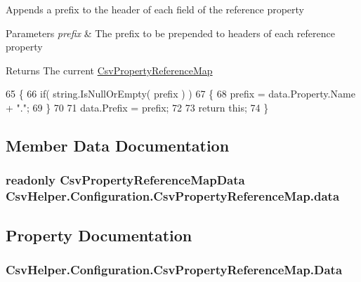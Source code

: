 Appends a prefix to the header of each field of the reference property 


\begin{DoxyParams}{Parameters}
{\em prefix} & The prefix to be prepended to headers of each reference property\\
\hline
\end{DoxyParams}
\begin{DoxyReturn}{Returns}
The current \hyperlink{a00055}{Csv\-Property\-Reference\-Map}
\end{DoxyReturn}

\begin{DoxyCode}
65         \{
66             \textcolor{keywordflow}{if}( \textcolor{keywordtype}{string}.IsNullOrEmpty( prefix ) )
67             \{
68                 prefix = data.Property.Name + \textcolor{stringliteral}{"."};
69             \}
70 
71             data.Prefix = prefix;
72 
73             \textcolor{keywordflow}{return} \textcolor{keyword}{this};
74         \}
\end{DoxyCode}


\subsection{Member Data Documentation}
\hypertarget{a00055_aa6926229eec915aa6a71c9ee603064f5}{
\subsubsection[{data}]{\setlength{\rightskip}{0pt plus 5cm}readonly {\bf Csv\-Property\-Reference\-Map\-Data} Csv\-Helper.\-Configuration.\-Csv\-Property\-Reference\-Map.\-data\hspace{0.3cm}{\ttfamily [private]}}}\label{a00055_aa6926229eec915aa6a71c9ee603064f5}


\subsection{Property Documentation}
\hypertarget{a00055_aa83ef91c4eb293a9d035013c8b4af016}{
\subsubsection[{Data}]{ Csv\-Helper.\-Configuration.\-Csv\-Property\-Reference\-Map.\-Data\hspace{0.3cm}{\ttfamily [get]}}}\label{a00055_aa83ef91c4eb293a9d035013c8b4af016}


